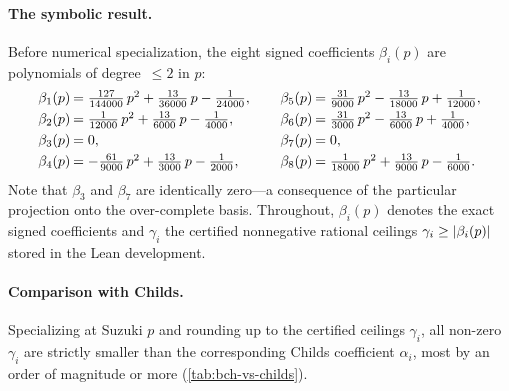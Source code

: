 \paragraph{The symbolic result.}
Before numerical specialization, the eight signed coefficients $\beta_i(p)$
are polynomials of degree~$\le 2$ in $p$:
\begin{equation}\label{eq:bch-gamma}
  \setlength{\arraycolsep}{1pt}
  \begin{array}{rlrlrl}
    \beta_1(p) &= \tfrac{127}{144000}\,p^2 + \tfrac{13}{36000}\,p - \tfrac{1}{24000}, \qquad &
    \beta_5(p) &= \tfrac{31}{9000}\,p^2 - \tfrac{13}{18000}\,p + \tfrac{1}{12000}, \\[3pt]
    \beta_2(p) &= \tfrac{1}{12000}\,p^2 + \tfrac{13}{6000}\,p - \tfrac{1}{4000}, &
    \beta_6(p) &= \tfrac{31}{3000}\,p^2 - \tfrac{13}{6000}\,p + \tfrac{1}{4000}, \\[3pt]
    \beta_3(p) &= 0, &
    \beta_7(p) &= 0, \\[3pt]
    \beta_4(p) &= -\tfrac{61}{9000}\,p^2 + \tfrac{13}{3000}\,p - \tfrac{1}{2000}, &
    \beta_8(p) &= \tfrac{1}{18000}\,p^2 + \tfrac{13}{9000}\,p - \tfrac{1}{6000}.
  \end{array}
\end{equation}
Note that $\beta_3$ and $\beta_7$ are identically zero---a consequence of
the particular projection onto the over-complete basis. Throughout,
$\beta_i(p)$ denotes the exact signed coefficients and $\gamma_i$ the
certified nonnegative rational ceilings $\gamma_i \ge \left|\beta_i(p)\right|$
stored in the Lean development.

\paragraph{Comparison with Childs.}
Specializing at Suzuki $p$ and rounding up to the certified ceilings
$\gamma_i$, all non-zero $\gamma_i$ are strictly
smaller than the corresponding Childs coefficient $\alpha_i$, most by
an order of magnitude or more (\cref{tab:bch-vs-childs}).

